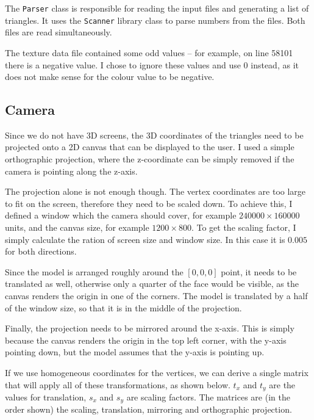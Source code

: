 \documentclass[]{article}
\begin{document}
The \texttt{Parser} class is responsible for reading the input files and generating a list of triangles. It uses the \texttt{Scanner} library class to parse numbers from the files. Both files are read simultaneously.

The texture data file contained some odd values -- for example, on line 58101 there is a negative value. I chose to ignore these values and use 0 instead, as it does not make sense for the colour value to be negative.

\subsection{Camera}

Since we do not have 3D screens, the 3D coordinates of the triangles need to be projected onto a 2D canvas that can be displayed to the user. I used a simple orthographic projection, where the z-coordinate can be simply removed if the camera is pointing along the z-axis.

The projection alone is not enough though. The vertex coordinates are too large to fit on the screen, therefore they need to be scaled down. To achieve this, I defined a window which the camera should cover, for example $240000 \times 160000$ units, and the canvas size, for example $1200 \times 800$. To get the scaling factor, I simply calculate the ration of screen size and window size. In this case it is $0.005$ for both directions.

Since the model is arranged roughly around the $[0, 0, 0]$ point, it needs to be translated as well, otherwise only a quarter of the face would be visible, as the canvas renders the origin in one of the corners. The model is translated by a half of the window size, so that it is in the middle of the projection.

Finally, the projection needs to be mirrored around the x-axis. This is simply because the canvas renders the origin in the top left corner, with the y-axis pointing down, but the model assumes that the y-axis is pointing up.

If we use homogeneous coordinates for the vertices, we can derive a single matrix that will apply all of these transformations, as shown below. $t_x$ and $t_y$ are the values for translation, $s_x$ and $s_y$ are scaling factors. The matrices are (in the order shown) the scaling, translation, mirroring and orthographic projection.
\end{document}

